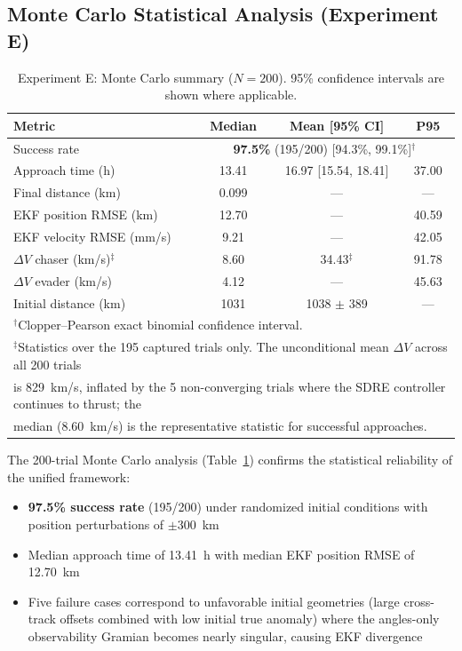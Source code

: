 \documentclass[preprint,3p,times]{elsarticle}
\begin{document}
\subsection{Monte Carlo Statistical Analysis (Experiment E)}

\begin{table}[h]
\centering
\caption{Experiment E: Monte Carlo summary ($N = 200$). 95\% confidence intervals are shown where applicable.}
\label{tab:expE}
\begin{tabular}{lccc}
\toprule
Metric & Median & Mean [95\% CI] & P95 \\
\midrule
Success rate & \multicolumn{3}{c}{\textbf{97.5\%} (195/200) [94.3\%, 99.1\%]$^\dagger$} \\
Approach time (h)                 & 13.41 & 16.97 [15.54, 18.41] & 37.00 \\
Final distance (km)               & 0.099 & --- & --- \\
EKF position RMSE (km)            & 12.70 & --- & 40.59 \\
EKF velocity RMSE (mm/s)          & 9.21  & --- & 42.05 \\
$\Delta V$ chaser (km/s)$^\ddagger$ & 8.60 & 34.43$^\ddagger$      & 91.78 \\
$\Delta V$ evader (km/s)          & 4.12  & --- & 45.63 \\
Initial distance (km)             & 1031  & 1038 $\pm$ 389 & --- \\
\bottomrule
\multicolumn{4}{l}{\footnotesize $^\dagger$Clopper--Pearson exact binomial confidence interval.} \\
\multicolumn{4}{l}{\footnotesize $^\ddagger$Statistics over the 195 captured trials only. The unconditional mean $\Delta V$ across all 200 trials} \\
\multicolumn{4}{l}{\footnotesize is 829~km/s, inflated by the 5 non-converging trials where the SDRE controller continues to thrust; the} \\
\multicolumn{4}{l}{\footnotesize median (8.60~km/s) is the representative statistic for successful approaches.} \\
\end{tabular}
\end{table}

The 200-trial Monte Carlo analysis (Table~\ref{tab:expE}) confirms the statistical reliability of the unified framework:
\begin{itemize}
    \item \textbf{97.5\% success rate} (195/200) under randomized initial conditions with position perturbations of $\pm 300$~km
    \item Median approach time of 13.41~h with median EKF position RMSE of 12.70~km
    \item Five failure cases correspond to unfavorable initial geometries (large cross-track offsets combined with low initial true anomaly) where the angles-only observability Gramian becomes nearly singular, causing EKF divergence
\end{itemize}
\end{document}
